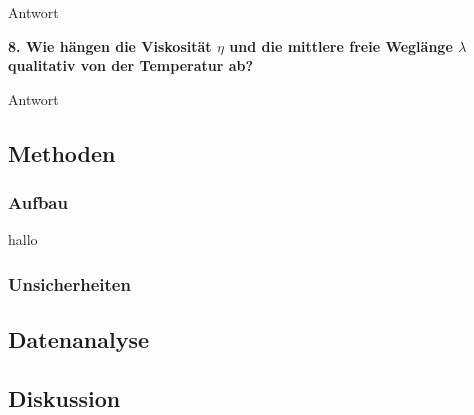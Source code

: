 	Antwort

\noindent \textbf{8. Wie hängen die Viskosität $\eta$ und die mittlere freie Weglänge $\lambda$ qualitativ von der Temperatur ab?}

	Antwort
	

\subsection{Methoden}

\subsubsection{Aufbau}

hallo\cite{aufbau}
\cite{Elementarladung}

\subsubsection{Unsicherheiten}


\subsection{Datenanalyse}


\subsection{Diskussion}


